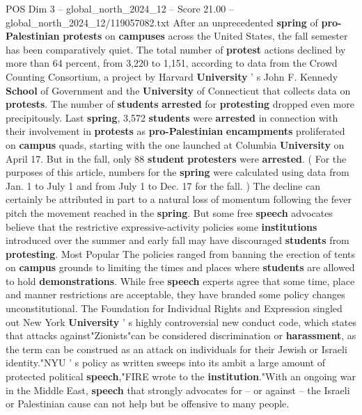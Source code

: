 \begin{textsample}{POS Dim 3 – global\_north\_2024\_12 – Score 21.00 – global\_north\_2024\_12/119057082.txt}  \label{ex:f3_pos_228}
After an unprecedented \textbf{spring} of \textbf{pro-Palestinian} \textbf{protests} on \textbf{campuses} across the United States, the fall semester has been comparatively quiet.
The total number of \textbf{protest} actions declined by more than 64 percent, from 3,220 to 1,151, according to data from the Crowd Counting Consortium, a project by Harvard \textbf{University} ' s John F.
Kennedy \textbf{School} of Government and the \textbf{University} of Connecticut that collects data on \textbf{protests}.
The number of \textbf{students} \textbf{arrested} for \textbf{protesting} dropped even more precipitously.
Last \textbf{spring}, 3,572 \textbf{students} were \textbf{arrested} in connection with their involvement in \textbf{protests} as \textbf{pro-Palestinian} \textbf{encampments} proliferated on \textbf{campus} quads, starting with the one launched at Columbia \textbf{University} on April 17.
But in the fall, only 88 \textbf{student} \textbf{protesters} were \textbf{arrested}. ( For the purposes of this article, numbers for the \textbf{spring} were calculated using data from Jan. 1 to July 1 and from July 1 to Dec. 17 for the fall. ) The decline can certainly be attributed in part to a natural loss of momentum following the fever pitch the movement reached in the \textbf{spring}.
But some free \textbf{speech} advocates believe that the restrictive expressive-activity policies some \textbf{institutions} introduced over the summer and early fall may have discouraged \textbf{students} from \textbf{protesting}.
Most Popular The policies ranged from banning the erection of tents on \textbf{campus} grounds to limiting the times and places where \textbf{students} are allowed to hold \textbf{demonstrations}.
While free \textbf{speech} experts agree that some time, place and manner restrictions are acceptable, they have branded some policy changes unconstitutional.
The Foundation for Individual Rights and Expression singled out New York \textbf{University} ' s highly controversial new conduct code, which states that attacks against"Zionists"can be considered discrimination or \textbf{harassment}, as the term can be construed as an attack on individuals for their Jewish or Israeli identity."NYU ' s policy as written sweeps into its ambit a large amount of protected political \textbf{speech},"FIRE wrote to the \textbf{institution}."With an ongoing war in the Middle East, \textbf{speech} that strongly advocates for -- or against -- the Israeli or Palestinian cause can not help but be offensive to many people.

\end{textsample}

